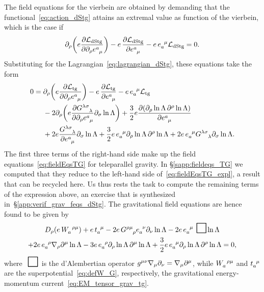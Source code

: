 \documentclass[
final,
11pt,
a4paper,
DIV=11,
headinclude=true,
footinclude=false,
bibliography=totoc,
twoside=true,  %
BCOR=5mm
]{scrbook}
\begin{document}
The field equations for the vierbein are obtained by demanding 
that the functional~\eqref{eq:action_dStg} attains an extremal 
value as function of the vierbein, which is the case if
\begin{equation}
\label{eq:fieldEqs_dStg}
  \pd_\rho \bigg(e \frac{\pd \mc{L}_\mrm{dStg}}{\pd \pd_\rho 
    e\ind{^a_\mu}} \bigg) - e\, \frac{\pd \mc{L}_\mrm{dStg}}{\pd 
    e\ind{^a_\mu}} - e\, e\ind{_a^\mu} \mc{L}_\mrm{dStg} = 0.
\end{equation}
Substituting for the Lagrangian~\eqref{eq:lagrangian_dStg}, these 
equations take the form
\begin{align}
  0 &=
  \pd_\rho \bigg(e \frac{\pd \mc{L}_\mrm{tg}}{\pd \pd_\rho 
    e\ind{^a_\mu}} \bigg) - e\, \frac{\pd \mc{L}_\mrm{tg}}{\pd 
    e\ind{^a_\mu}} - e\, e\ind{_a^\mu} \mc{L}_\mrm{tg}
  \notag
  \\
  &\nla{}- 2 \pd_\rho \bigg( e \frac{\pd 
    G\ind{^{\lambda\sigma}_\lambda}}{\pd\pd_\rho e\ind{^a_\mu}} 
  \pd_\sigma \ln \Lambda \bigg)
  + \frac{3}{2} e \frac{\pd (\pd_\rho \ln \Lambda\, \pd^\rho \ln 
    \Lambda)}{\pd e\ind{^a_\mu}}
  \notag
  \\
  &\nla{}+ 2e 
  \frac{G\ind{^{\lambda\sigma}_\lambda}}{\pd e\ind{^a_\mu}} 
  \pd_\sigma \ln \Lambda
  + \frac{3}{2} e\, e\ind{_a^\mu} \pd_\rho \ln \Lambda\, 
  \pd^\rho\ln \Lambda + 2 e\, e\ind{_a^\mu} 
  G\ind{^{\lambda\sigma}_\lambda} \pd_\sigma \ln \Lambda.
  \label{eq:fieldEqs_dStg_notExpl}
\end{align}
The first three terms of the right-hand side make up the field 
equations~\eqref{eq:fieldEqsTG} for teleparallel gravity.  In 
\S\ref{sapp:fieldeqs_TG} we computed that they reduce to the 
left-hand side of~\eqref{eq:fieldEqsTG_expl}, a result that can 
be recycled here. Us thus rests the task to compute the remaining 
terms of the expression above, an exercise that is synthesized 
in~\S\ref{app:verif_grav_feqs_dStg}. The gravitational field 
equations are hence found to be given by
\begin{multline}
\label{eq:fieldEqs_dStg_expl}
   D_\rho (e\, W\ind{_a^{\rho\mu}}) + e\, t\ind{_a^\mu} - 2e\, 
   G\ind{^{\rho\mu}_\rho} e\ind{_a^\nu} \pd_\nu \ln \Lambda 
   - 2e\, e\ind{_a^\mu} \dal \ln \Lambda
   \\
   +2e\, e\ind{_a^\rho} \nabla_\rho \pd^\mu \ln \Lambda - 3 e\, 
   e\ind{_a^\rho} \pd_\rho \ln \Lambda\, \pd^\mu \ln \Lambda 
   + \frac{3}{2} e\, e\ind{_a^\mu} \pd_\rho \ln \Lambda\, 
   \pd^\rho \ln \Lambda = 0,
\end{multline}
where $\dal\hspace{0.1111em}$ is the d'Alembertian operator 
$g^{\mu\nu} \nabla_\mu \partial_\nu = \nabla_\mu \partial^\mu$, while 
$W\ind{_a^{\rho\mu}}$ and $t\ind{_a^\mu}$ are the 
superpotential~\eqref{eq:defW_G}, respectively, the gravitational 
energy-momentum current~\eqref{eq:EM_tensor_grav_tg}.
\end{document}
